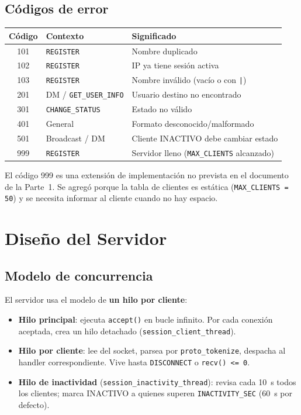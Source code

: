 \documentclass[12pt,a4paper]{article}
\begin{document}
\subsection{Códigos de error}

\begin{center}
\begin{tabular}{cll}
\toprule
\textbf{Código} & \textbf{Contexto} & \textbf{Significado} \\
\midrule
101 & \texttt{REGISTER}       & Nombre duplicado \\
102 & \texttt{REGISTER}       & IP ya tiene sesión activa \\
103 & \texttt{REGISTER}       & Nombre inválido (vacío o con \texttt{|}) \\
201 & DM / \texttt{GET\_USER\_INFO} & Usuario destino no encontrado \\
301 & \texttt{CHANGE\_STATUS} & Estado no válido \\
401 & General                 & Formato desconocido/malformado \\
501 & Broadcast / DM          & Cliente INACTIVO debe cambiar estado \\
999 & \texttt{REGISTER}       & Servidor lleno (\texttt{MAX\_CLIENTS} alcanzado) \\
\bottomrule
\end{tabular}
\end{center}

El código 999 es una extensión de implementación no prevista en el documento de la
Parte~1.  Se agregó porque la tabla de clientes es estática (\texttt{MAX\_CLIENTS =
50}) y se necesita informar al cliente cuando no hay espacio.

\section{Diseño del Servidor}
\label{sec:servidor}

\subsection{Modelo de concurrencia}

El servidor usa el modelo de \textbf{un hilo por cliente}:

\begin{itemize}[nosep]
    \item \textbf{Hilo principal}: ejecuta \texttt{accept()} en bucle infinito.
          Por cada conexión aceptada, crea un hilo detachado
          (\texttt{session\_client\_thread}).
    \item \textbf{Hilo por cliente}: lee del socket, parsea por
          \texttt{proto\_tokenize}, despacha al handler correspondiente.
          Vive hasta \texttt{DISCONNECT} o \texttt{recv() <= 0}.
    \item \textbf{Hilo de inactividad} (\texttt{session\_inactivity\_thread}):
          revisa cada 10~s todos los clientes; marca INACTIVO a quienes superen
          \texttt{INACTIVITY\_SEC} (60~s por defecto).
\end{itemize}
\end{document}
